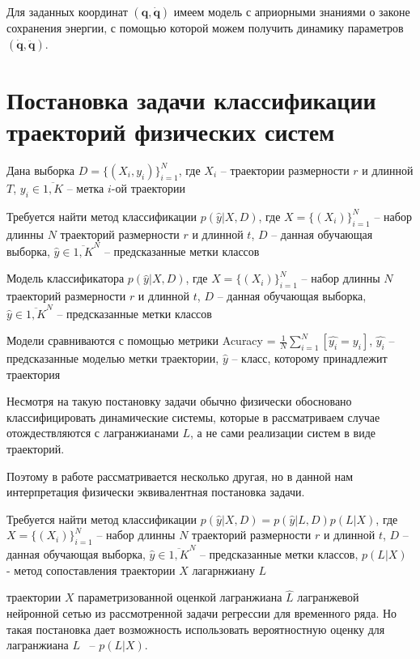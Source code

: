 \documentclass[a4paper, 12pt]{article}
\begin{document}
Для заданных координат $(\mathbf{q}, \mathbf{\dot{q}})$ имеем модель с априорными знаниями о законе сохранения энергии, с помощью которой можем получить динамику параметров $(\mathbf{\dot{q}}, \mathbf{\ddot{q}})$. 


\section{Постановка задачи классификации траекторий физических систем}\label{sec:classification}

Дана выборка
$D = \{(X_i, y_i)\}_{i=1}^N$, где $X_i$ -- траектории размерности $r$ и длинной $T$, $y_i \in \overline{1, K}$ -- метка $i$-ой траектории

Требуется найти метод классификации $p(\hat{y}|X, D)$, где $X = \{(X_i)\}_{i=1}^N$ -- набор длинны $N$ траекторий размерности $r$ и длинной $t$, $D$ -- данная обучающая выборка, $\hat{y} \in \overline{1, K}^N$ -- предсказанные метки классов

Модель классификатора $p(\hat{y}|X, D)$, где $X = \{(X_i)\}_{i=1}^N$ -- набор длинны $N$ траекторий размерности $r$ и длинной $t$, $D$ -- данная обучающая выборка, $\hat{y} \in \overline{1, K}^N$ -- предсказанные метки классов

Модели сравниваются с помощью метрики Acuracy = $\frac{1}{N} \sum_{i = 1}^N \left[\hat{y_i} = y_i\right]$, $\hat{y_i}$ -- предсказанные моделью метки траектории, $\hat{y}$ -- класс, которому принадлежит траектория

Несмотря на такую постановку задачи обычно физически обосновано классифицировать динамические системы, которые в рассматриваем случае отождествляются с лагранжианами $L$, а не сами реализации систем в виде траекторий. 

Поэтому в работе рассматривается несколько другая, но в данной нам интерпретация физически эквивалентная постановка задачи.

Требуется найти метод классификации $p(\hat{y}|X, D) = p(\hat{y}|L, D)p(L|X)$, где $X = \{(X_i)\}_{i=1}^N$ -- набор длинны $N$ траекторий размерности $r$ и длинной $t$, $D$ -- данная обучающая выборка, $\hat{y} \in \overline{1, K}^N$ -- предсказанные метки классов, $p(L|X)$ - метод сопоставления траектории $X$ лагарнжиану $L$

 траектории $X$ параметризованной оценкой лагранжиана $\hat{L}$  лагранжевой нейронной сетью из рассмотренной задачи регрессии для временного ряда. Но такая постановка дает возможность использовать вероятностную оценку для лагранжиана $L$ ~-- $p(L|X)$.
\end{document}

